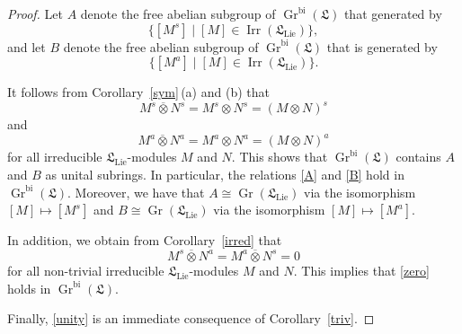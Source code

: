 \documentclass{jonasart}
\DeclareMathOperator{\bi}{bi}
\DeclareMathOperator{\irr}{Irr}
\DeclareMathOperator{\K}{Gr}
\DeclareMathOperator{\lie}{Lie}
\newcommand{\lf}{\mathfrak{L}}
\newcommand{\ovo}{\overline{\otimes}}
\begin{document}
	\begin{proof}
		Let $A$ denote the free abelian subgroup of $\K^{\bi}(\lf)$ that generated by
		\[\{[M^s ]\mid[M]\in\irr(\lf_{\lie})\},\] and let $B$ denote the free abelian subgroup of $\K^{\bi}(\lf)$ that is generated by \[\{[M^a ]\mid[M]\in\irr(\lf_{\lie})\}.\]

		It follows from Corollary~\ref{sym}\,(a) and (b) that
		\[
			M^s\ovo N^s =M^s\otimes N^s =(M\otimes N)^s
		\]
		and
		\[
			M^a\ovo N^a =M^a\otimes N^a =(M\otimes N)^a
		\]
		for all irreducible $\lf_{\lie}$-modules $M$ and $N$. This shows that $\K^{\bi}(\lf)$
		contains $A$ and $B$ as unital subrings. In particular, the relations
		\eqref{A} and \eqref{B} hold in $\K^{\bi}(\lf)$. Moreover, we have that $A\cong\K
		(\lf_{\lie})$ via the isomorphism $[M]\mapsto[M^s ]$ and $B\cong\K(\lf_{\lie})$ via the isomorphism $[M]\mapsto[M^a ]$.

		In addition, we obtain from Corollary~\ref{irred} that
		\[
			M^s\ovo N^a =M^a\ovo N^s =0
		\]
		for all non-trivial irreducible $\lf_{\lie}$-modules $M$ and $N$. This implies that
		\eqref{zero} holds in $\K^{\bi}(\lf)$.

		Finally, \eqref{unity} is an immediate consequence of Corollary~\ref{triv}.
	\end{proof}
\end{document}
